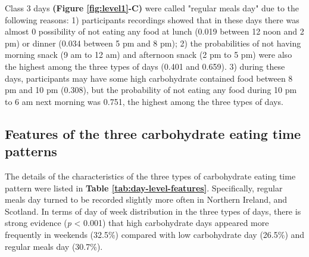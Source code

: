 Class 3 days \textbf{(Figure \ref{fig:level1}-C)} were called "regular meals day" due to the following reasons: 1) participants recordings showed that in these days there was almost 0 possibility of not eating any food at lunch (0.019 between 12 noon and 2 pm) or dinner (0.034 between 5 pm and 8 pm); 2) the probabilities of not having morning snack (9 am to 12 am) and afternoon snack (2 pm to 5 pm) were also the highest among the three types of days (0.401 and 0.659). 3) during these days, participants may have some high carbohydrate contained food between 8 pm and 10 pm (0.308), but the probability of not eating any food during 10 pm to 6 am next morning was 0.751, the highest among the three types of days. \vspace{-0.5cm}


\subsection{Features of the three carbohydrate eating time patterns}

The details of the characteristics of the three types of carbohydrate eating time pattern were listed in\textbf{ Table \ref{tab:day-level-features}}. Specifically, regular meals day turned to be recorded slightly more often in Northern Ireland, and Scotland. In terms of day of week distribution in the three types of days, there is strong evidence (\textit{p} < 0.001) that high carbohydrate days appeared more frequently in weekends (32.5\%) compared with low carbohydrate day (26.5\%) and regular meals day (30.7\%).


